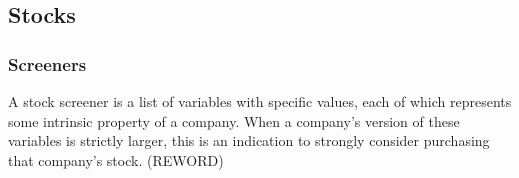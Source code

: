 \subsection{Stocks}
\subsubsection{Screeners}
A stock screener is a list of variables with specific values, each of which represents some intrinsic property of a company. When a company's version of these variables is strictly larger, this is an indication to strongly consider purchasing that company's stock. (REWORD)